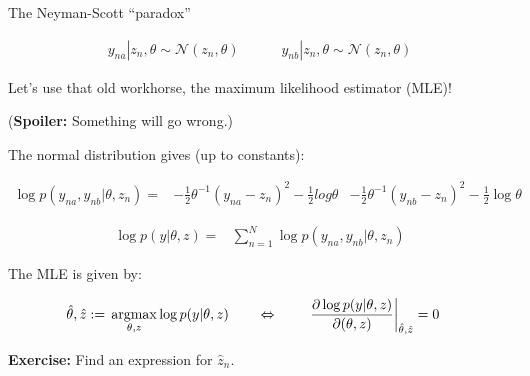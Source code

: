 \begin{frame}{The Neyman-Scott ``paradox''}

\begin{align*}
    y_{na} | z_n, \theta \sim{} \mathcal{N}(z_n, \theta) \quad\quad\quad
    y_{nb} | z_n, \theta \sim{} \mathcal{N}(z_n, \theta)
\end{align*}

Let's use that old workhorse, the maximum likelihood estimator (MLE)!

(\textbf{Spoiler:} Something will go wrong.)

The normal distribution gives (up to constants):

%
\begin{align*}
%
\log p(y_{na}, y_{nb} | \theta, z_n) ={}&
-\frac{1}{2} \theta^{-1} \left( y_{na}  - z_n\right)^2 - \frac{1}{2}log \theta
&-\frac{1}{2} \theta^{-1} \left( y_{nb}  - z_n\right)^2 - \frac{1}{2}\log \theta
%
\end{align*}
%

\begin{align*}
%
\log p(y | \theta, z) ={}&
\sum_{n=1}^N \log p(y_{na}, y_{nb} | \theta, z_n)
%
\end{align*}
%

The MLE is given by:

%
\begin{align*}
%
\hat\theta, \hat{z} :={}& \argmax_{\theta, z}  \log p(y | \theta, z)
\quad\quad\Leftrightarrow{}\quad\quad
\fracat{\partial \log p(y | \theta, z)}{\partial (\theta, z)}{\thetahat, \hat{z}} ={} 0
%
\end{align*}
%

\textbf{Exercise:} Find an expression for $\hat{z}_n$.

\end{frame}





